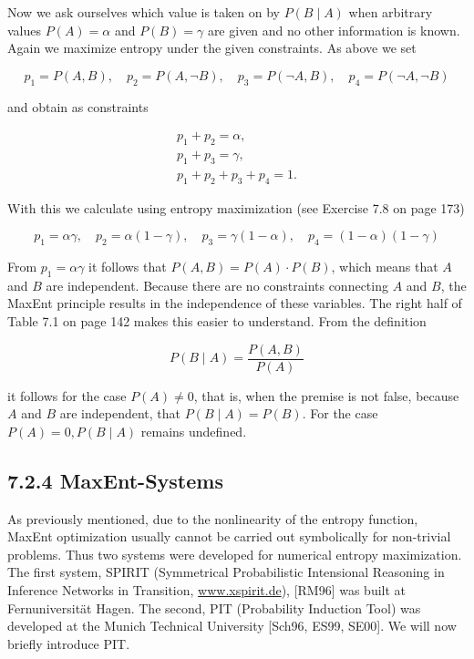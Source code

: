 \documentclass[10pt]{article}
\begin{document}
Now we ask ourselves which value is taken on by $P(B \mid A)$ when arbitrary values $P(A)=\alpha$ and $P(B)=\gamma$ are given and no other information is known. Again we maximize entropy under the given constraints. As above we set

$$
p_{1}=P(A, B), \quad p_{2}=P(A, \neg B), \quad p_{3}=P(\neg A, B), \quad p_{4}=P(\neg A, \neg B)
$$

and obtain as constraints


\begin{gather*}
p_{1}+p_{2}=\alpha,  \tag{7.10}\\
p_{1}+p_{3}=\gamma,  \tag{7.11}\\
p_{1}+p_{2}+p_{3}+p_{4}=1 . \tag{7.12}
\end{gather*}


With this we calculate using entropy maximization (see Exercise 7.8 on page 173)

$$
p_{1}=\alpha \gamma, \quad p_{2}=\alpha(1-\gamma), \quad p_{3}=\gamma(1-\alpha), \quad p_{4}=(1-\alpha)(1-\gamma)
$$

From $p_{1}=\alpha \gamma$ it follows that $P(A, B)=P(A) \cdot P(B)$, which means that $A$ and $B$ are independent. Because there are no constraints connecting $A$ and $B$, the MaxEnt principle results in the independence of these variables. The right half of Table 7.1 on page 142 makes this easier to understand. From the definition

$$
P(B \mid A)=\frac{P(A, B)}{P(A)}
$$

it follows for the case $P(A) \neq 0$, that is, when the premise is not false, because $A$ and $B$ are independent, that $P(B \mid A)=P(B)$. For the case $P(A)=0, P(B \mid A)$ remains undefined.

\subsection*{7.2.4 MaxEnt-Systems}
As previously mentioned, due to the nonlinearity of the entropy function, MaxEnt optimization usually cannot be carried out symbolically for non-trivial problems. Thus two systems were developed for numerical entropy maximization. The first system, SPIRIT (Symmetrical Probabilistic Intensional Reasoning in Inference Networks in Transition, \href{http://www.xspirit.de}{www.xspirit.de}), [RM96] was built at Fernuniversität Hagen. The second, PIT (Probability Induction Tool) was developed at the Munich Technical University [Sch96, ES99, SE00]. We will now briefly introduce PIT.
\end{document}
